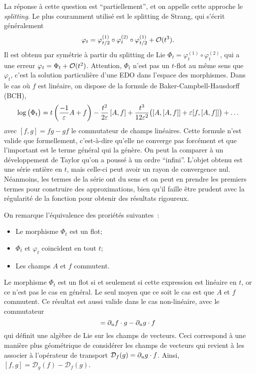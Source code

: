 La réponse à cette question est \enquote{partiellement}, et on appelle cette approche le \textit{splitting}. Le plus couramment utilisé est le splitting de Strang, qui s'écrit généralement
\begin{equation*}
    \varphi_t = \varphi^{(1)}_{t/2} \circ \varphi^{(2)}_{t} \circ \varphi^{(1)}_{t/2} + \mathcal{O}(t^3) .
\end{equation*}
Il est obtenu par symétrie à partir du splitting de Lie $\Phi_t = \varphi^{(1)}_{t} \circ \varphi^{(2)}_{t}$, qui a une erreur $\varphi_t = \Phi_t + \mathcal{O}(t^2)$. Attention, $\Phi_t$ n'est pas un $t$-flot au même sens que $\varphi_t$, c'est la solution particulière d'une EDO dans l'espace des morphismes. Dans le cas où $f$ est linéaire, on dispose de la formule de Baker-Campbell-Hausdorff (BCH),
\begin{equation*}
    \log \big( \Phi_t \big)
    = t\left(\frac{-1}{\varepsilon}A + f\right) 
    - \frac{t^2}{2\varepsilon} \left[A, f\right]
    + \frac{t^3}{12\varepsilon^2}\big( [A,[A,f]] + \varepsilon [f,[A,f]] \big)
    + \ldots
\end{equation*}
avec $[f,g] = fg - gf$ le commutateur de champs linéaires. Cette formule n'est valide que formellement, c'est-à-dire qu'elle ne converge pas forcément et que l'important est le terme général qui la génère. On peut la comparer à un développement de Taylor qu'on a poussé à un ordre \enquote{infini}. L'objet obtenu est une série entière en $t$, mais celle-ci peut avoir un rayon de convergence nul. Néanmoins, les termes de la série ont du sens et on peut en prendre les premiers termes pour construire des approximations, bien qu'il faille être prudent avec la régularité de la fonction pour obtenir des résultats rigoureux.

On remarque l'équivalence des proriétés suivantes~:
\begin{itemize}
    \item Le morphisme $\Phi_t$ est un flot;
    \item $\Phi_t$ et $\varphi_t$ coincïdent en tout $t$;
    \item Les champs $A$ et $f$ commutent.
\end{itemize}
Le morphisme $\Phi_t$ est un flot si et seulement si cette expression est linéaire en $t$, or ce n'est pas le cas en général. Le seul moyen que ce soit le cas est que $A$ et $f$ commutent. Ce résultat est aussi valide dans le cas non-linéaire, avec le commutateur
\begin{equation*}
    [f,g] = \pa_u f \cdot g - \pa_u g \cdot f 
\end{equation*}
qui définit une algèbre de Lie sur les champs de vecteurs. Ceci correspond à une manière plus géométrique de considérer les champs de vecteurs qui revient à les associer à l'opérateur de transport $\mathcal{D}_f(g) = \partial_u g \cdot f$. Ainsi, $[f,g] = \mathcal{D}_g(f) - \mathcal{D}_f(g)$. 


